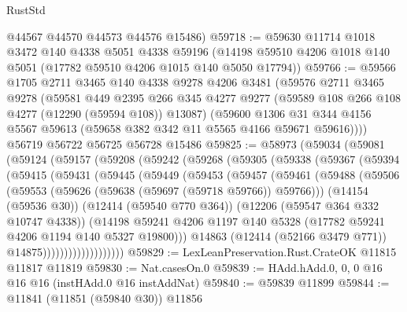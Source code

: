 \begin{lexlean}{RustStd}
\begin{coremodule}
{\begin{coremodule}
{{{{{{{{{{{{{{{{{{{{{{{{{{{{{{{{{{{{{{{{{{{{{{{{{{      @44567
      @44570
      @44573
      @44576
      @15486)
@59718 := @59630
    @11714
    @1018
    @3472
    @140
    @4338
    @5051
    @4338
    @59196
    (@14198 @59510 @4206 @1018 @140 @5051 (@17782 @59510 @4206 @1015 @140 @5050 @17794))
@59766 := @59566
    @1705
    @2711
    @3465
    @140
    @4338
    @9278
    @4206
    @3481
    (@59576
      @2711
      @3465
      @9278
      (@59581
        @449
        @2395
        @266
        @345
        @4277
        @9277
        (@59589 @108 @266 @108 @4277 (@12290 (@59594 @108)) @13087)
        (@59600
          @1306
          @31
          @344
          @4156
          @5567
          @59613
          (@59658 @382 @342 @11 @5565 @4166 @59671 @59616))))
    @56719
    @56722
    @56725
    @56728
    @15486
@59825 := @58973
    (@59034
      (@59081
        (@59124
          (@59157
            (@59208
              (@59242
                (@59268
                  (@59305
                    (@59338
                      (@59367
                        (@59394
                          (@59415
                            (@59431
                              (@59445
                                (@59449
                                  (@59453
                                    (@59457
                                      (@59461
                                        (@59488
                                          (@59506
                                            (@59553
                                              (@59626 (@59638 (@59697 (@59718 @59766)) @59766)))
                                            (@14154 (@59536 @30))
                                            (@12414 (@59540 @770 @364))
                                            (@12206 (@59547 @364 @332 @10747 @4338))
                                            (@14198
                                              @59241
                                              @4206
                                              @1197
                                              @140
                                              @5328
                                              (@17782 @59241 @4206 @1194 @140 @5327 @19800)))
                                          @14863
                                          (@12414 (@52166 @3479 @771))
                                          @14875)))))))))))))))))))
@59829 := LexLeanPreservation.Rust.CrateOK @11815 @11817 @11819
@59830 := Nat.casesOn.{0}
@59839 := HAdd.hAdd.{0, 0, 0} @16 @16 @16 (instHAdd.{0} @16 instAddNat)
@59840 := @59839 @11899
@59844 := @11841 (@11851 (@59840 @30)) @11856
}}}}}}}}}}}}}}}}}}}}}}}}}}}}}}}}}}}}}}}}}}}}}}}}}}
\end{coremodule}}
\end{coremodule}
\end{lexlean}

